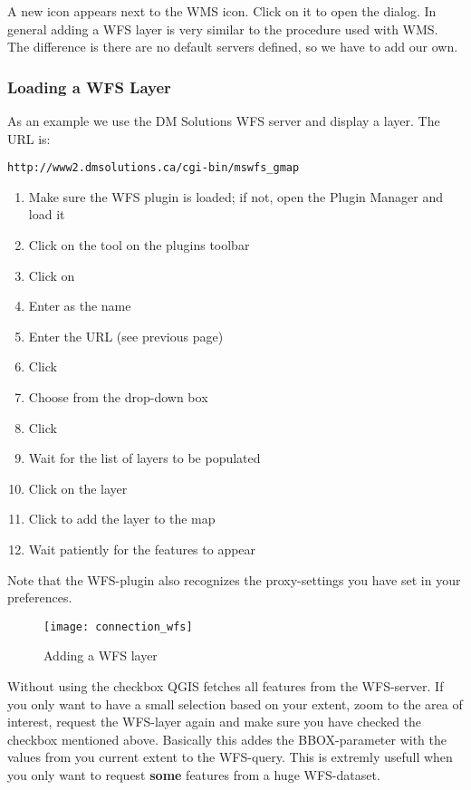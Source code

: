 A new  icon appears next
to the WMS icon. Click on it to open the dialog. In general adding a WFS
layer is very similar to the procedure used with WMS. The difference is
there are no default servers defined, so we have to add our own.

\subsubsection{Loading a WFS Layer}

As an example we use the DM Solutions WFS server and display a layer. The URL is:
\begin{verbatim}
http://www2.dmsolutions.ca/cgi-bin/mswfs_gmap
\end{verbatim}

\begin{enumerate}
  \item Make sure the WFS plugin is loaded; if not, open the Plugin Manager and load it
  \item Click on the
  tool on the plugins toolbar
  \item Click on 
  \item Enter  as the name
  \item Enter the URL (see previous page)
  \item Click 
  \item Choose  from the drop-down box
  \item Click 
  \item Wait for the list of layers to be populated
  \item Click on the  layer
  \item Click  to add the layer to the map
  \item Wait patiently for the features to appear
\end{enumerate}

Note that the WFS-plugin also recognizes the proxy-settings you have set
in your preferences.

\begin{figure}[ht]
  \centering
  	\texttt{[image: connection\_wfs]}
  	\caption{Adding a WFS layer \nixcaption}\label{fig:wfs_dmsolutions}
\end{figure}

Without using the checkbox  QGIS fetches all features from the WFS-server. If you
only want to have a small selection based on your extent, zoom to the area
of interest, request the WFS-layer again and make sure you have checked
the checkbox mentioned above. Basically this addes the BBOX-parameter with
the values from you current extent to the WFS-query. This is extremly
usefull when you only want to request \textbf{some} features from a huge
WFS-dataset.

